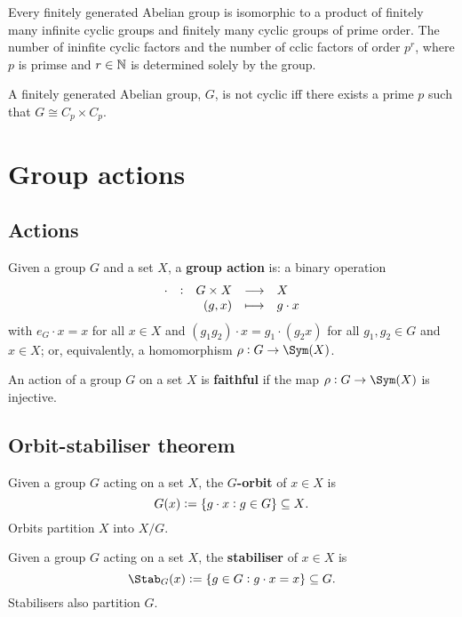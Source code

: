\documentclass[../Year2.tex]{subfiles}
\begin{document}
\begin{theorem}
    Every finitely generated Abelian group is isomorphic to a product of finitely many infinite cyclic groups and finitely many cyclic groups of prime order. The number of ininfite cyclic factors and the number of cclic factors of order $p^r$, where $p$ is primse and $r\in\mathbb{N}$ is determined solely by the group.
\end{theorem}

\begin{theorem}
    A finitely generated Abelian group, $G$, is not cyclic iff there exists a prime $p$ such that $G\cong C_p\times C_p$.
\end{theorem}

\section{Group actions}

\subsection{Actions}

\begin{definition}[Actions]
    Given a group $G$ and a set $X$, a \textbf{group action} is: a binary operation \[
        \function[\cdot]{G\times X}{X}{(g,x)}{g\cdot x}
    \] with $e_G\cdot x=x$ for all $x\in X$ and $(g_1g_2)\cdot x = g_1 \cdot (g_2 x)$ for all $g_1,g_2\in G$ and $x\in X$; or, equivalently, a homomorphism $\rho:G\rightarrow \Sym(X)$.
\end{definition}

\begin{definition}
    An action of a group $G$ on a set $X$ is \textbf{faithful} if the map $\rho:G\rightarrow\Sym(X)$ is injective.
\end{definition}

\subsection{Orbit-stabiliser theorem}

\begin{definition}[Orbit]
    Given a group $G$ acting on a set $X$, the \textbf{$G$-orbit} of $x\in X$ is \[
        G(x):=\{g\cdot x:g\in G\} \subseteq X
    \text{\textcolor{black}{.}}
    \] Orbits partition $X$ into $X/G$.
\end{definition}

\begin{definition}[Stabiliser]
    Given a group $G$ acting on a set $X$, the \textbf{stabiliser} of $x\in X$ is \[
        \Stab_G(x):= \{g\in G: g\cdot x = x\} \subseteq G
        \black{.}
    \] Stabilisers also partition $G$.
\end{definition}
\end{document}
